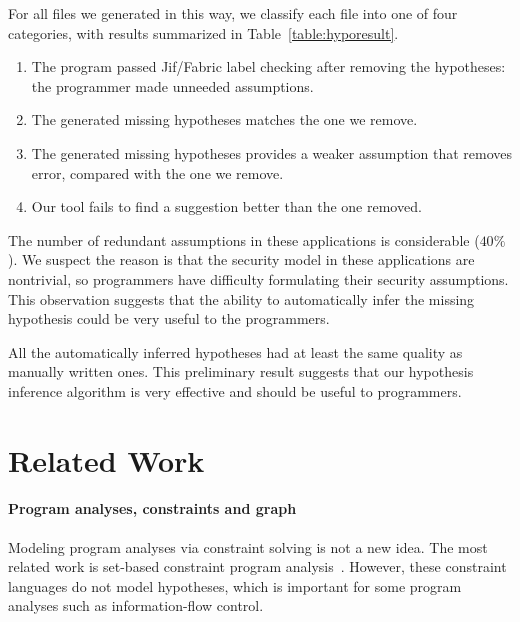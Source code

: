 For all files we generated in this way, we classify each file into
one of four categories, with results summarized in
Table~\ref{table:hyporesult}.

\begin{enumerate}
\item The program passed Jif/Fabric label checking after removing the
hypotheses: the programmer made unneeded assumptions.

\item The generated missing hypotheses matches the one we remove.

\item The generated missing hypotheses provides a weaker assumption
that removes error, compared with the one we remove.

\item Our tool fails to find a suggestion better than the one
removed.
\end{enumerate}

The number of redundant assumptions in these
applications is considerable ($40\%$). We suspect the reason is that
the security model in these applications are nontrivial, so
programmers have difficulty formulating their security assumptions.
This observation suggests that the ability to automatically infer
the missing hypothesis could be very useful to the programmers.

All the automatically inferred hypotheses had at least the same quality as
manually written ones.
This preliminary result suggests that our hypothesis inference
algorithm is very effective and should be useful to programmers.
 
\section{Related Work}

\paragraph{Program analyses, constraints and graph} 

Modeling program analyses via constraint solving is not a new idea.
The most related work is set-based constraint program
analysis~\cite{aiken-setconstraint, aiken-typeinclusion}.  However,
these constraint languages do not model hypotheses, which is important
for some program analyses such as information-flow control.
 
